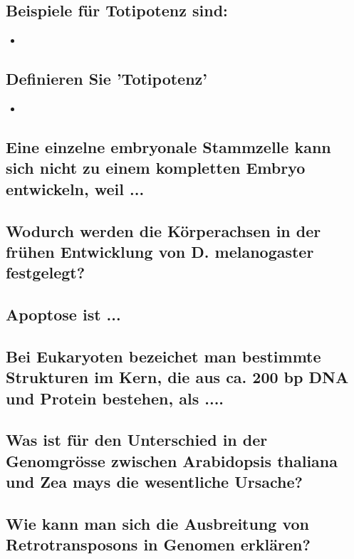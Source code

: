 \documentclass{article}
\begin{document}
\subsection*{Beispiele für Totipotenz sind:}
\begin{itemize}
    \item 
\end{itemize}
\subsection*{Definieren Sie 'Totipotenz'}
\begin{itemize}     \item  \end{itemize}
\bigskip\bigskip \bigskip

\subsection*{Eine einzelne embryonale Stammzelle kann sich nicht zu einem
kompletten Embryo entwickeln, weil ...}
\bigskip\bigskip 


\subsection*{Wodurch werden die Körperachsen in der frühen Entwicklung von D.
melanogaster festgelegt?}
\bigskip\bigskip 

\subsection*{Apoptose ist ...}
\bigskip\bigskip 

\subsection*{Bei Eukaryoten bezeichet man bestimmte Strukturen im Kern, die aus ca.
200 bp DNA und Protein bestehen, als ....}
\bigskip
\subsection*{Was ist für den Unterschied in der Genomgrösse zwischen Arabidopsis
thaliana und Zea mays die wesentliche Ursache?}
\bigskip\bigskip 

\subsection*{Wie kann man sich die Ausbreitung von Retrotransposons in Genomen
erklären?}
\bigskip\bigskip\bigskip\bigskip
\end{document}
